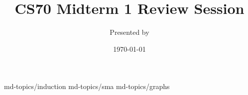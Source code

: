 

\title{CS70 Midterm 1 Review Session}
\author{Presented by }
\date{\today}

\newcommand{\SlideAccessingLogistics}{@\#}





%



 {md-topics/induction}
 {md-topics/sma}
 {md-topics/graphs}



